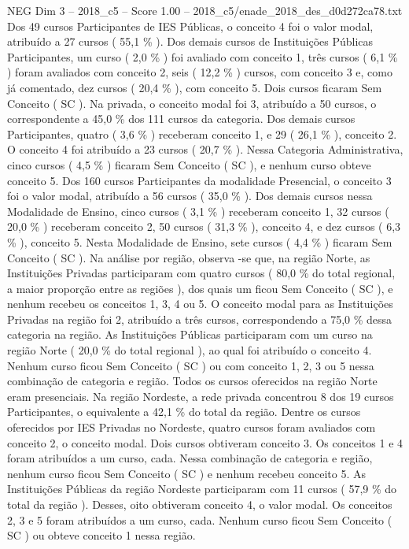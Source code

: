 \begin{textsample}{NEG Dim 3 – 2018\_c5 – Score 1.00 – 2018\_c5/enade\_2018\_des\_d0d272ca78.txt}
Dos 49 cursos Participantes de IES Públicas, o conceito 4 foi o valor modal, atribuído a 27 cursos ( 55,1 \% ).
Dos demais cursos de Instituições Públicas Participantes, um curso ( 2,0 \% ) foi avaliado com conceito 1, três cursos ( 6,1 \% ) foram avaliados com conceito 2, seis ( 12,2 \% ) cursos, com conceito 3 e, como já comentado, dez cursos ( 20,4 \% ), com conceito 5.
Dois cursos ficaram Sem Conceito ( SC ).
Na privada, o conceito modal foi 3, atribuído a 50 cursos, o correspondente a 45,0 \% dos 111 cursos da categoria.
Dos demais cursos Participantes, quatro ( 3,6 \% ) receberam conceito 1, e 29 ( 26,1 \% ), conceito 2.
O conceito 4 foi atribuído a 23 cursos ( 20,7 \% ).
Nessa Categoria Administrativa, cinco cursos ( 4,5 \% ) ficaram Sem Conceito ( SC ), e nenhum curso obteve conceito 5.
Dos 160 cursos Participantes da modalidade Presencial, o conceito 3 foi o valor modal, atribuído a 56 cursos ( 35,0 \% ).
Dos demais cursos nessa Modalidade de Ensino, cinco cursos ( 3,1 \% ) receberam conceito 1, 32 cursos ( 20,0 \% ) receberam conceito 2, 50 cursos ( 31,3 \% ), conceito 4, e dez cursos ( 6,3 \% ), conceito 5.
Nesta Modalidade de Ensino, sete cursos ( 4,4 \% ) ficaram Sem Conceito ( SC ).
Na análise por região, observa -se que, na região Norte, as Instituições Privadas participaram com quatro cursos ( 80,0 \% do total regional, a maior proporção entre as regiões ), dos quais um ficou Sem Conceito ( SC ), e nenhum recebeu os conceitos 1, 3, 4 ou 5.
O conceito modal para as Instituições Privadas na região foi 2, atribuído a três cursos, correspondendo a 75,0 \% dessa categoria na região.
As Instituições Públicas participaram com um curso na região Norte ( 20,0 \% do total regional ), ao qual foi atribuído o conceito 4.
Nenhum curso ficou Sem Conceito ( SC ) ou com conceito 1, 2, 3 ou 5 nessa combinação de categoria e região.
Todos os cursos oferecidos na região Norte eram presenciais.
Na região Nordeste, a rede privada concentrou 8 dos 19 cursos Participantes, o equivalente a 42,1 \% do total da região.
Dentre os cursos oferecidos por IES Privadas no Nordeste, quatro cursos foram avaliados com conceito 2, o conceito modal.
Dois cursos obtiveram conceito 3.
Os conceitos 1 e 4 foram atribuídos a um curso, cada.
Nessa combinação de categoria e região, nenhum curso ficou Sem Conceito ( SC ) e nenhum recebeu conceito 5.
As Instituições Públicas da região Nordeste participaram com 11 cursos ( 57,9 \% do total da região ).
Desses, oito obtiveram conceito 4, o valor modal.
Os conceitos 2, 3 e 5 foram atribuídos a um curso, cada.
Nenhum curso ficou Sem Conceito ( SC ) ou obteve conceito 1 nessa região.

\end{textsample}
